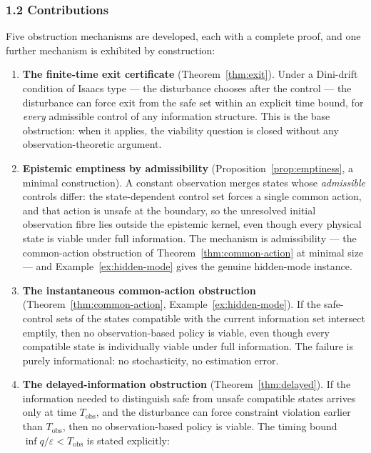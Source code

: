 \documentclass[11pt]{article}
\theoremstyle{definition}
\begin{document}
\subsubsection{1.2 Contributions}\label{contributions}

Five obstruction mechanisms are developed, each with a complete proof,
and one further mechanism is exhibited by construction:

\begin{enumerate}
\def\labelenumi{\arabic{enumi}.}
\item
  \textbf{The finite-time exit certificate} (Theorem~\ref{thm:exit}). Under a
  Dini-drift condition of Isaacs type --- the disturbance chooses after
  the control --- the disturbance can force exit from the safe set
  within an explicit time bound, for \emph{every} admissible control of
  any information structure. This is the base obstruction: when it
  applies, the viability question is closed without any
  observation-theoretic argument.
\item
  \textbf{Epistemic emptiness by admissibility} (Proposition~\ref{prop:emptiness}, a minimal
  construction). A constant observation merges states whose
  \emph{admissible} controls differ: the state-dependent control set
  forces a single common action, and that action is unsafe at the
  boundary, so the unresolved initial observation fibre lies outside the
  epistemic kernel, even though every physical state is viable under
  full information. The mechanism is admissibility --- the common-action
  obstruction of Theorem~\ref{thm:common-action} at minimal size --- and Example~\ref{ex:hidden-mode} gives the genuine hidden-mode instance.
\item
  \textbf{The instantaneous common-action obstruction} (Theorem~\ref{thm:common-action},
  Example~\ref{ex:hidden-mode}). If the safe-control sets of the states compatible with the
  current information set intersect emptily, then no observation-based
  policy is viable, even though every compatible state is individually
  viable under full information. The failure is purely informational: no
  stochasticity, no estimation error.
\item
  \textbf{The delayed-information obstruction} (Theorem~\ref{thm:delayed}). If the
  information needed to distinguish safe from unsafe compatible states
  arrives only at time \(T_{\mathrm{obs}}\), and the disturbance can
  force constraint violation earlier than \(T_{\mathrm{obs}}\), then no
  observation-based policy is viable. The timing bound
  \(\inf q / \varepsilon < T_{\mathrm{obs}}\) is stated explicitly:

\end{enumerate}
\end{document}
